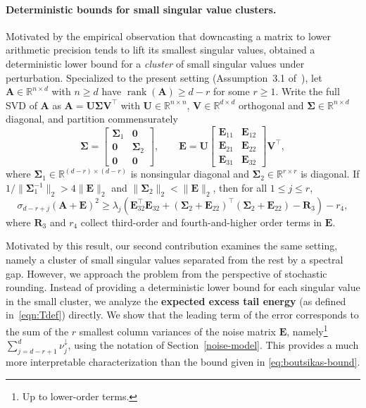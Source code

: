 \documentclass{article}
\newcommand{\twonorm}[1]{\|#1\|_2}
\newcommand{\Ex}[1]{\mbox{}\mathbb{E}\left[#1\right]}
\newcommand{\ts}{\top}
\newcommand{\R}{\mathbb{R}} %
\newcommand{\Ab}{\mathbf{A}}
\newcommand{\Eb}{\mathbf{E}}
\newcommand{\Rb}{\mathbf{R}}
\newcommand{\Ub}{\mathbf{U}}
\newcommand{\Vb}{\mathbf{V}}
\newcommand{\Abtil}{\tilde{\Ab}}
\newcommand{\rank}{\mathop{\mathrm{rank}}}
\newcommand{\rbr}[1]{\left(#1\right)}
\newcommand{\Sigmab}{\mathbf{\Sigma}}
\begin{document}
\paragraph{Deterministic bounds for small singular value clusters.}
Motivated by the empirical observation that downcasting a matrix to lower arithmetic precision tends to lift its smallest singular values, \citet[Theorem~3.5]{boutsikas2024small} obtained a deterministic lower bound for a \emph{cluster} of small singular values under perturbation. Specialized to the present setting (Assumption~3.1 of~\citealp{boutsikas2024small}), let $\Ab \in \R^{n \times d}$ with $n \ge d$ have $\rank(\Ab) \ge d - r$ for some $r \ge 1$. Write the full SVD of $\Ab$ as $\Ab = \Ub\Sigmab\Vb^\ts$ with $\Ub \in \R^{n\times n}$, $\Vb \in \R^{d\times d}$ orthogonal and $\Sigmab \in \R^{n\times d}$ diagonal, and partition commensurately
\begin{equation*}
    \Sigmab = \begin{bmatrix} \Sigmab_1 & \mathbf{0} \\ \mathbf{0} & \Sigmab_2 \\ \mathbf{0} & \mathbf{0} \end{bmatrix}, \qquad
    \Eb = \Ub \begin{bmatrix} \Eb_{11} & \Eb_{12} \\ \Eb_{21} & \Eb_{22} \\ \Eb_{31} & \Eb_{32} \end{bmatrix} \Vb^\ts,
\end{equation*}
where $\Sigmab_1 \in \R^{(d-r)\times(d-r)}$ is nonsingular diagonal and $\Sigmab_2 \in \R^{r\times r}$ is diagonal. If $1/\twonorm{\Sigmab_1^{-1}} > 4\twonorm{\Eb}$ and $\twonorm{\Sigmab_2} < \twonorm{\Eb}$, then for all $1 \le j \le r$,
\begin{equation}\label{eq:boutsikas-bound}
    \sigma_{d-r+j}(\Ab + \Eb)^2 \ge \lambda_j\rbr{\Eb_{32}^\ts \Eb_{32} + (\Sigmab_2 + \Eb_{22})^\ts(\Sigmab_2 + \Eb_{22}) - \Rb_3} - r_4,
\end{equation}
where $\Rb_3$ and $r_4$ collect third-order and fourth-and-higher order terms in $\Eb$.

Motivated by this result, our second contribution examines the same setting, namely a cluster of small singular values separated from the rest by a spectral gap. However, we approach the problem from the perspective of stochastic rounding. Instead of providing a deterministic lower bound for each singular value in the small cluster, we analyze the \textbf{expected excess tail energy} (as defined in~\eqref{eqn:Tdef}) directly. 
%
%
We show that the leading term of the error corresponds to the sum of the $r$ smallest column variances of the noise matrix $\Eb$, namely\footnote{Up to lower-order terms.} 
%
$\sum_{j=d-r+1}^d \nu_j^\downarrow$, using the notation of Section~\ref{noise-model}. This provides a much more interpretable characterization than the bound given in \eqref{eq:boutsikas-bound}.
\end{document}
